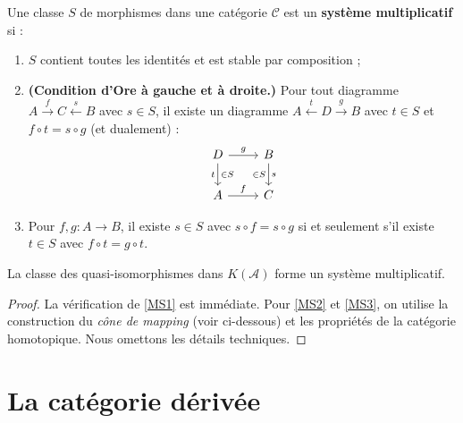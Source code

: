 \begin{definition}\label{def:multiplicative-system}
Une classe $S$ de morphismes dans une catégorie $\mathcal{C}$ est un
\textbf{système multiplicatif} si :
\begin{enumerate}[label=(MS\arabic*)]
\item\label{MS1} $S$ contient toutes les identités et est stable par
  composition ;
\item\label{MS2} \textbf{(Condition d'Ore à gauche et à droite.)}
  Pour tout diagramme $A \xrightarrow{f} C \xleftarrow{s} B$ avec
  $s \in S$, il existe un diagramme $A \xleftarrow{t} D \xrightarrow{g} B$
  avec $t \in S$ et $f \circ t = s \circ g$ (et dualement) :
\[
\begin{tikzcd}
D \arrow[r, "g"] \arrow[d, "t"', "{\in S}"] & B \arrow[d, "s", "{\in S}"'] \\
A \arrow[r, "f"] & C
\end{tikzcd}
\]
\item\label{MS3} Pour $f, g \colon A \to B$, il existe $s \in S$ avec
  $s \circ f = s \circ g$ si et seulement s'il existe $t \in S$ avec
  $f \circ t = g \circ t$.
\end{enumerate}
\end{definition}

\begin{proposition}\label{prop:qiso-multiplicative}
La classe des quasi-isomorphismes dans $K(\mathcal{A})$ forme un
système multiplicatif.
\end{proposition}

\begin{proof}
La vérification de \ref{MS1} est immédiate.
Pour \ref{MS2} et \ref{MS3}, on utilise la construction du
\emph{cône de mapping} (voir ci-dessous) et
les propriétés de la catégorie homotopique. Nous omettons les détails
techniques.
\end{proof}


\section{La catégorie dérivée}\label{sec:derived-category}

